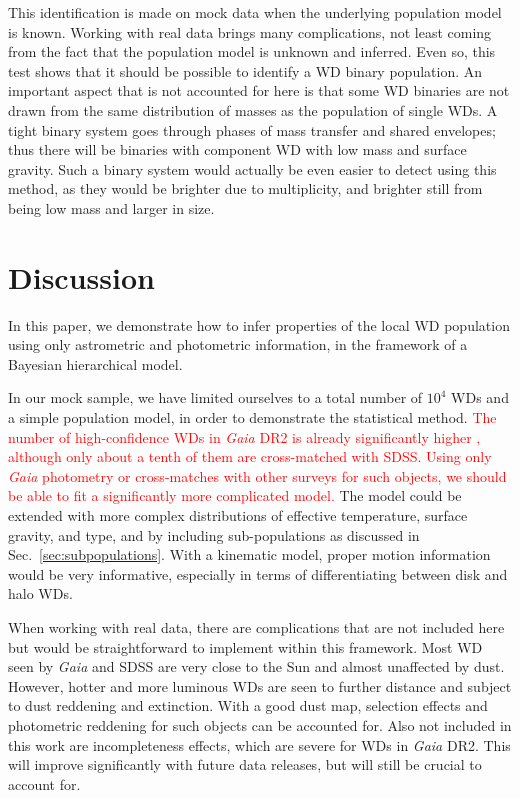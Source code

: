 \documentclass[fleqn,usenatbib]{mnras}
\newcommand{\changes}[1]{\textcolor{red}{#1}}
\begin{document}
This identification is made on mock data when the underlying population model is known. Working with real data brings many complications, not least coming from the fact that the population model is unknown and inferred. Even so, this test shows that it should be possible to identify a WD binary population. An important aspect that is not accounted for here is that some WD binaries are not drawn from the same distribution of masses as the population of single WDs. A tight binary system goes through phases of mass transfer and shared envelopes; thus there will be binaries with component WD with low mass and surface gravity. Such a binary system would actually be even easier to detect using this method, as they would be brighter due to multiplicity, and brighter still from being low mass and larger in size.







\section{Discussion}\label{sec:discussion}

In this paper, we demonstrate how to infer properties of the local WD population using only astrometric and photometric information, in the framework of a Bayesian hierarchical model.

In our mock sample, we have limited ourselves to a total number of $10^4$ WDs and a simple population model, in order to demonstrate the statistical method. \changes{The number of high-confidence WDs in \emph{Gaia} DR2 is already significantly higher \citep[roughly 260,000 in][]{2018arXiv180703315G}, although only about a tenth of them are cross-matched with SDSS. Using only \emph{Gaia} photometry or cross-matches with other surveys for such objects, we should be able to fit a significantly more complicated model.} The model could be extended with more complex distributions of effective temperature, surface gravity, and type, and by including sub-populations as discussed in Sec.~\ref{sec:subpopulations}. With a kinematic model, proper motion information would be very informative, especially in terms of differentiating between disk and halo WDs.

When working with real data, there are complications that are not included here but would be straightforward to implement within this framework. Most WD seen by \emph{Gaia} and SDSS are very close to the Sun and almost unaffected by dust. However, hotter and more luminous WDs are seen to further distance and subject to dust reddening and extinction. With a good dust map, selection effects and photometric reddening for such objects can be accounted for. Also not included in this work are incompleteness effects, which are severe for WDs in \emph{Gaia} DR2. This will improve significantly with future data releases, but will still be crucial to account for.
\end{document}
